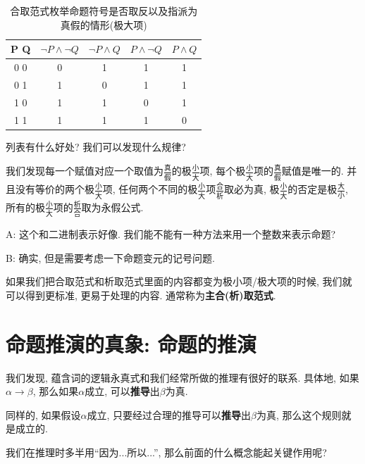\begin{table}
	\centering
	\begin{tabular}{|c|c|c|c|c|}
		\hline
		P Q & $\lnot P \land \lnot Q$ & $\lnot P \land  Q$ & $P \land \lnot Q $& $ P \land  Q$\\
		\hline
		0 0 & 0 & 1 & 1 & 1\\
		0 1 & 1 & 0 & 1 & 1\\
		1 0 & 1 & 1 & 0 & 1\\
		1 1 & 1 & 1 & 1 & 0\\
		\hline
	\end{tabular}
	\label{tab:max}
	\caption{合取范式枚举命题符号是否取反以及指派为真假的情形(极大项)}
\end{table}

\begin{bonus}
	列表有什么好处? 我们可以发现什么规律? 
\end{bonus}

我们发现每一个赋值对应一个取值为$\frac{\text{真}}{\text{假}}$的极$\frac{\text{小}}{\text{大}}$项, 每个极$\frac{\text{小}}{\text{大}}$项的$\frac{\text{真}}{\text{假}}$赋值是唯一的. 并且没有等价的两个极$\frac{\text{小}}{\text{大}}$项, 任何两个不同的极$\frac{\text{小}}{\text{大}}$项$\frac{\text{合}}{\text{析}}$取必为真, 极$\frac{\text{小}}{\text{大}}$的否定是极$\frac{\text{大}}{\text{小}}$, 所有的极$\frac{\text{小}}{\text{大}}$项的$\frac{\text{析}}{\text{合}}$取为永假公式. 

\begin{dialogue}
	A: 这个和二进制表示好像. 我们能不能有一种方法来用一个整数来表示命题? 
	
	B: 确实, 但是需要考虑一下命题变元的记号问题. 
\end{dialogue}

如果我们把合取范式和析取范式里面的内容都变为极小项/极大项的时候, 我们就可以得到更标准, 更易于处理的内容. 通常称为\textbf{主合(析)取范式}. 

\section{命题推演的真象: 命题的推演}

我们发现, 蕴含词的逻辑永真式和我们经常所做的推理有很好的联系. 具体地, 如果$\alpha \to \beta$, 那么如果$\alpha$成立, 可以\textbf{推导}出$\beta$为真. 

同样的, 如果假设$\alpha$成立, 只要经过合理的推导可以\textbf{推导}出$\beta$为真, 那么这个规则就是成立的.  


我们在推理时多半用“因为...所以...”, 那么前面的什么概念能起关键作用呢?

